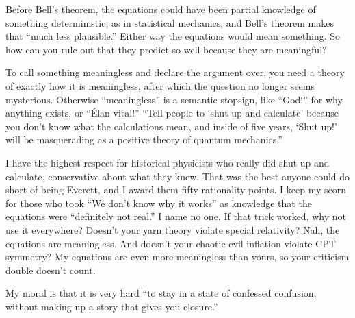 Before Bell's theorem, the equations could have been partial knowledge of something deterministic, as in statistical mechanics, and Bell's theorem makes that ``much less plausible.''  Either way the equations would mean something. So how can you rule out that they predict so well because they are meaningful? 

To call something meaningless and declare the argument over, you need a theory of exactly how it is meaningless, after which the question no longer seems mysterious. Otherwise ``meaningless'' is a semantic stopsign, like ``God!'' for why anything exists, or ``Élan vital!'' ``Tell people to `shut up and calculate' because you don't know what the calculations mean, and inside of five years, `Shut up!' will be masquerading as a positive theory of quantum mechanics.'' 

I have the highest respect for historical physicists who really did shut up and calculate, conservative about what they knew. That was the best anyone could do short of being Everett, and I award them fifty rationality points. I keep my scorn for those who took ``We don't know why it works'' as knowledge that the equations were ``definitely not real.'' I name no one. If that trick worked, why not use it everywhere? Doesn't your yarn theory violate special relativity? Nah, the equations are meaningless. And doesn't your chaotic evil inflation violate CPT symmetry? My equations are even more meaningless than yours, so your criticism double doesn't count.

My moral is that it is very hard ``to stay in a state of confessed confusion, without making up a story that gives you closure.''
